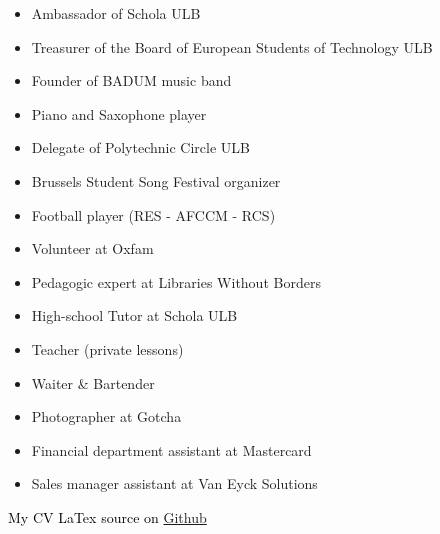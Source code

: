 
\vspace{1.5em}


\begin{itemize}
\item Ambassador of Schola ULB
\item Treasurer of the Board of European Students of Technology ULB
\item Founder of BADUM music band
\item Piano and Saxophone player
\item Delegate of Polytechnic Circle ULB
\item Brussels Student Song Festival organizer
\item Football player (RES - AFCCM - RCS)
\item Volunteer at Oxfam
\end{itemize}
\vspace{1.5em}

\vspace{1.5em}

\vspace{1.5em}

\vspace{1.5em}

\begin{itemize}
    \item Pedagogic expert at Libraries Without Borders
    \item High-school Tutor at Schola ULB
    \item Teacher (private lessons)
    \item Waiter \& Bartender
    \item Photographer at Gotcha
    \item Financial department assistant at Mastercard
    \item Sales manager assistant at Van Eyck Solutions
\end{itemize}

\vspace{4em}
\hspace{8em}\textcolor{black}{My CV LaTex source on}
\href{https://github.com/sachamedaer}{Github}
\vspace{10em}